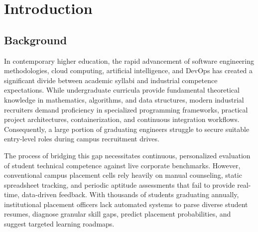 \documentclass[12pt,a4paper]{report}
\begin{document}
\renewcommand{\contentsname}{Table of Contents}
\tableofcontents
{}
\listoffigures
{}
\listoftables
{}
\newpage


\pagestyle{fancy}
\fancyhf{}
\renewcommand{\headrulewidth}{0.5pt}
\renewcommand{\footrulewidth}{0.5pt}



\chapter{Introduction}
\par
\section{Background}
In contemporary higher education, the rapid advancement of software engineering methodologies, cloud computing, artificial intelligence, and DevOps has created a significant divide between academic syllabi and industrial competence expectations. While undergraduate curricula provide fundamental theoretical knowledge in mathematics, algorithms, and data structures, modern industrial recruiters demand proficiency in specialized programming frameworks, practical project architectures, containerization, and continuous integration workflows. Consequently, a large portion of graduating engineers struggle to secure suitable entry-level roles during campus recruitment drives.

The process of bridging this gap necessitates continuous, personalized evaluation of student technical competence against live corporate benchmarks. However, conventional campus placement cells rely heavily on manual counseling, static spreadsheet tracking, and periodic aptitude assessments that fail to provide real-time, data-driven feedback. With thousands of students graduating annually, institutional placement officers lack automated systems to parse diverse student resumes, diagnose granular skill gaps, predict placement probabilities, and suggest targeted learning roadmaps.
\end{document}
